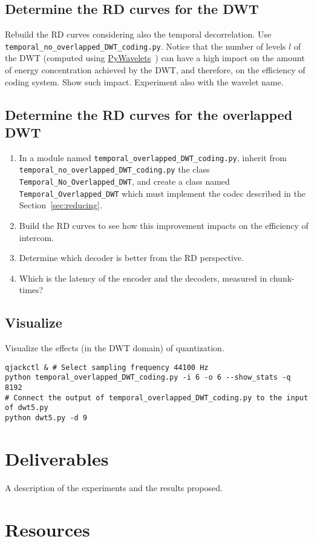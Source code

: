 \subsection{Determine the RD curves for the DWT}

Rebuild the RD curves considering also the temporal decorrelation. Use
\verb|temporal_no_overlapped_DWT_coding.py|. Notice that the number of
levels $l$ of the DWT (computed using
\href{https://pywavelets.readthedocs.io/en/latest/}{PyWavelets}~\cite{lee2019pywavelets})
can have a high impact on the amount of energy concentration achieved
by the DWT, and therefore, on the efficiency of coding system. Show
such impact. Experiment also with the wavelet name.


\subsection{Determine the RD curves for the overlapped DWT}

\begin{enumerate}
\item In a module named \verb|temporal_overlapped_DWT_coding.py|,
  inherit from \verb|temporal_no_overlapped_DWT_coding.py| the class
  \verb|Temporal_No_Overlapped_DWT|, and create a class named
  \verb|Temporal_Overlapped_DWT| which must implement the codec
  described in the Section~\ref{sec:reducing}.
\item Build the RD curves to see how this improvement impacts on the
  efficiency of intercom.
\item Determine which decoder is better from the RD perspective.
\item Which is the latency of the encoder and the decoders, measured
  in chunk-times?
\end{enumerate}


\subsection{Visualize}

Visualize the effects (in the DWT domain) of quantization.
\begin{verbatim}
qjackctl & # Select sampling frequency 44100 Hz 
python temporal_overlapped_DWT_coding.py -i 6 -o 6 --show_stats -q 8192
# Connect the output of temporal_overlapped_DWT_coding.py to the input of dwt5.py
python dwt5.py -d 9
\end{verbatim}



\section{Deliverables}
A description of the experiments and the results proposed.

\section{Resources}



